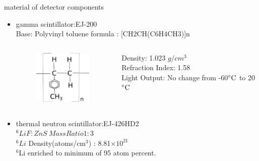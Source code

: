 \documentclass[11pt,compress,xcolor=x11names,UTF8]{beamer}
\begin{document}
\begin{frame}{ material of detector components}
\begin{itemize}
	\item gamma scintillator:EJ-200   \\
		Base: Polyvinyl toluene \quad  formula : [CH2CH(C6H4CH3)]n
\begin{columns}
\begin{column}{.23\textwidth}
\begin{figure}
	\includegraphics[width=0.97\textwidth]{currentfig/Chemical_formula_for_polyvinyl_tolulene.png}
\end{figure}
\end{column}
	\vspace{.5cm}
\begin{column}{.73\textwidth}
	Density: 1.023 $g/cm^3$\\
	Refraction Index: 1.58 \\
	Light Output: No change from -60$\celsius $ to 20 $\celsius$
\end{column}
\end{columns}
		
	\item thermal neutron scintillator:EJ-426HD2\\
	$^6LiF:ZnS \ Mass Ratio 1:3$\\
		$^6Li $ Density(atoms/cm$^3$)  : 8.81$\times 10^{21}$\\
		$^6$Li enriched to minimum of 95 atom percent.
\end{itemize}
\end{frame}
\end{document}
